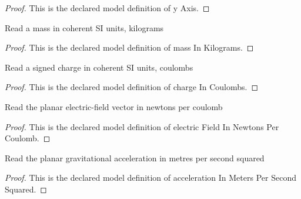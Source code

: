 \begin{proof}
  This is the declared model definition of y Axis.
\end{proof}
\begin{definition}
  \label{def:physics:phyx-mini-0905:phyxminiproblems-problemphyxmini0905-massinkilograms}
  Read a mass in coherent SI units, kilograms
\end{definition}
\begin{proof}
  This is the declared model definition of mass In Kilograms.
\end{proof}
\begin{definition}
  \label{def:physics:phyx-mini-0905:phyxminiproblems-problemphyxmini0905-chargeincoulombs}
  Read a signed charge in coherent SI units, coulombs
\end{definition}
\begin{proof}
  This is the declared model definition of charge In Coulombs.
\end{proof}
\begin{definition}
  \label{def:physics:phyx-mini-0905:phyxminiproblems-problemphyxmini0905-electricfieldinnewtonspercoulomb}
  Read the planar electric-field vector in newtons per coulomb
\end{definition}
\begin{proof}
  This is the declared model definition of electric Field In Newtons Per Coulomb.
\end{proof}
\begin{definition}
  \label{def:physics:phyx-mini-0905:phyxminiproblems-problemphyxmini0905-accelerationinmeterspersecondsquared}
  Read the planar gravitational acceleration in metres per second squared
\end{definition}
\begin{proof}
  This is the declared model definition of acceleration In Meters Per Second Squared.
\end{proof}
